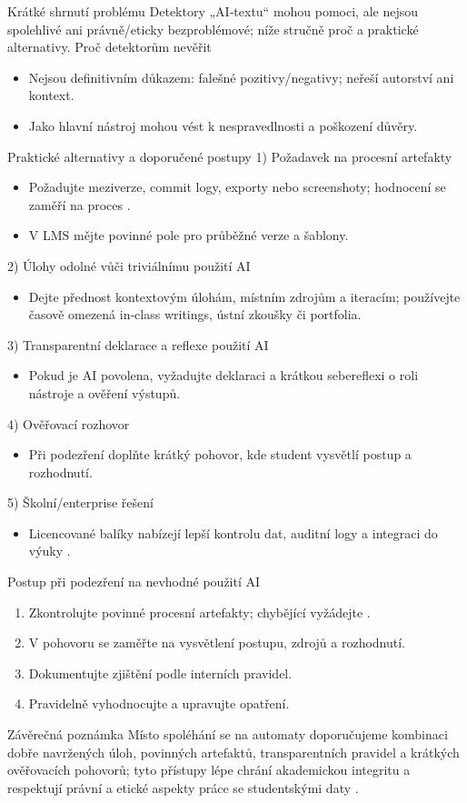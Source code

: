 Krátké shrnutí problému
Detektory „AI‑textu“ mohou pomoci, ale nejsou spolehlivé ani právně/eticky bezproblémové; níže stručně proč a praktické alternativy.
Proč detektorům nevěřit \begin{itemize}
  \item Nejsou definitivním důkazem: falešné pozitivy/negativy; neřeší autorství ani kontext.
  \item Jako hlavní nástroj mohou vést k nespravedlnosti a poškození důvěry.
\end{itemize}
Praktické alternativy a doporučené postupy
1) Požadavek na procesní artefakty \begin{itemize}
  \item Požadujte meziverze, commit logy, exporty nebo screenshoty; hodnocení se zaměří na proces \cite{kb_ai_101_tipu_pdf_04e4a115_page_8_1}.
  \item V LMS mějte povinné pole pro průběžné verze a šablony.
\end{itemize}
2) Úlohy odolné vůči triviálnímu použití AI \begin{itemize}
  \item Dejte přednost kontextovým úlohám, místním zdrojům a iteracím; používejte časově omezená in‑class writings, ústní zkoušky či portfolia.
\end{itemize}
3) Transparentní deklarace a reflexe použití AI \begin{itemize}
  \item Pokud je AI povolena, vyžadujte deklaraci a krátkou sebereflexi o roli nástroje a ověření výstupů.
\end{itemize}
4) Ověřovací rozhovor \begin{itemize}
  \item Při podezření doplňte krátký pohovor, kde student vysvětlí postup a rozhodnutí.
\end{itemize}
5) Školní/enterprise řešení \begin{itemize}
  \item Licencované balíky nabízejí lepší kontrolu dat, auditní logy a integraci do výuky \cite{kb_ai_101_tipu_pdf_04e4a115_page_36_1,kb_ai_101_tipu_pdf_04e4a115_page_15_2}.
\end{itemize}
Postup při podezření na nevhodné použití AI \begin{enumerate}
  \item Zkontrolujte povinné procesní artefakty; chybějící vyžádejte \cite{kb_ai_101_tipu_pdf_04e4a115_page_8_1}.
  \item V pohovoru se zaměřte na vysvětlení postupu, zdrojů a rozhodnutí.
  \item Dokumentujte zjištění podle interních pravidel.
  \item Pravidelně vyhodnocujte a upravujte opatření.
\end{enumerate}
Závěrečná poznámka
Místo spoléhání se na automaty doporučujeme kombinaci dobře navržených úloh, povinných artefaktů, transparentních pravidel a krátkých ověřovacích pohovorů; tyto přístupy lépe chrání akademickou integritu a respektují právní a etické aspekty práce se studentskými daty \cite{kb_ai_101_tipu_pdf_04e4a115_page_8_1,kb_ai_101_tipu_pdf_04e4a115_page_36_1,kb_ai_101_tipu_pdf_04e4a115_page_15_2}.